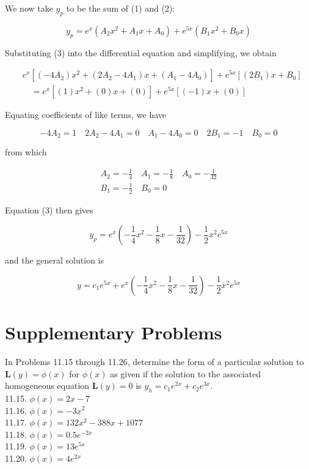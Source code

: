 \documentclass[10pt]{article}
\begin{document}
We now take $y_{p}$ to be the sum of (1) and (2):


\begin{equation*}
y_{p}=e^{x}\left(A_{2} x^{2}+A_{1} x+A_{0}\right)+e^{5 x}\left(B_{1} x^{2}+B_{0} x\right) \tag{3}
\end{equation*}


Substituting (3) into the differential equation and simplifying, we obtain

$$
\begin{aligned}
& e^{x}\left[\left(-4 A_{2}\right) x^{2}+\left(2 A_{2}-4 A_{1}\right) x+\left(A_{1}-4 A_{0}\right)\right]+e^{5 x}\left[\left(2 B_{1}\right) x+B_{0}\right] \\
& \quad=e^{x}\left[(1) x^{2}+(0) x+(0)\right]+e^{5 x}[(-1) x+(0)]
\end{aligned}
$$

Equating coefficients of like terms, we have

$$
-4 A_{2}=1 \quad 2 A_{2}-4 A_{1}=0 \quad A_{1}-4 A_{0}=0 \quad 2 B_{1}=-1 \quad B_{0}=0
$$

from which

$$
\begin{gathered}
A_{2}=-\frac{1}{4} \quad A_{1}=-\frac{1}{8} \quad A_{0}=-\frac{1}{32} \\
B_{1}=-\frac{1}{2} \quad B_{0}=0
\end{gathered}
$$

Equation (3) then gives

$$
y_{p}=e^{x}\left(-\frac{1}{4} x^{2}-\frac{1}{8} x-\frac{1}{32}\right)-\frac{1}{2} x^{2} e^{5 x}
$$

and the general solution is

$$
y=c_{1} e^{5 x}+e^{x}\left(-\frac{1}{4} x^{2}-\frac{1}{8} x-\frac{1}{32}\right)-\frac{1}{2} x^{2} e^{5 x}
$$

\section*{Supplementary Problems}
In Problems 11.15 through 11.26, determine the form of a particular solution to $\mathbf{L}(y)=\phi(x)$ for $\phi(x)$ as given if the solution to the associated homogeneous equation $\mathbf{L}(y)=0$ is $y_{h}=c_{1} e^{2 x}+c_{2} e^{3 x}$.\\
11.15. $\phi(x)=2 x-7$\\
11.16. $\phi(x)=-3 x^{2}$\\
11.17. $\phi(x)=132 x^{2}-388 x+1077$\\
11.18. $\phi(x)=0.5 e^{-2 x}$\\
11.19. $\phi(x)=13 e^{5 x}$\\
11.20. $\phi(x)=4 e^{2 x}$
\end{document}
